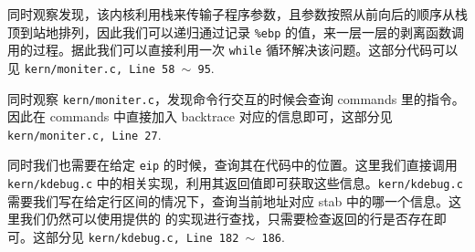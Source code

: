 \documentclass[11pt]{article}
\begin{document}
		同时观察发现，该内核利用栈来传输子程序参数，且参数按照从前向后的顺序从栈顶到站地排列，因此我们可以递归通过记录 \texttt{\%ebp} 的值，来一层一层的剥离函数调用的过程。据此我们可以直接利用一次 \texttt{while} 循环解决该问题。这部分代码可以见 \texttt{kern/moniter.c, Line 58 $\sim$ 95}.
		
		同时观察 \texttt{kern/moniter.c}，发现命令行交互的时候会查询 commands 里的指令。因此在 commands 中直接加入 backtrace 对应的信息即可，这部分见  \texttt{kern/moniter.c, Line 27}.
		
		同时我们也需要在给定 \texttt{eip} 的时候，查询其在代码中的位置。这里我们直接调用 \texttt{kern/kdebug.c} 中的相关实现，利用其返回值即可获取这些信息。\texttt{kern/kdebug.c} 需要我们写在给定行区间的情况下，查询当前地址对应 stab 中的哪一个信息。这里我们仍然可以使用提供的  的实现进行查找，只需要检查返回的行是否存在即可。这部分见 \texttt{kern/kdebug.c, Line 182 $\sim$ 186}.
		
		
		
		
\end{document}
